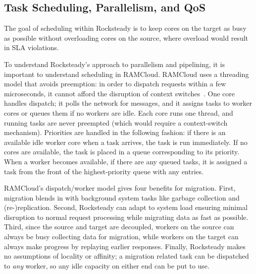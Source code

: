 \subsection{Task Scheduling, Parallelism, and QoS}
\label{sec:qos}

The goal of scheduling within Rocksteady is to keep cores on the target as
busy as possible without overloading cores on the source, where overload 
would result in SLA violations.

To understand Rocksteady's approach to parallelism and pipelining, it is
important to understand scheduling in RAMCloud.
RAMCloud uses a threading model that avoids preemption: in order to dispatch requests
within a few microseconds, it cannot afford the disruption of context
switches~\cite{ramcloud}. One core handles dispatch; it polls the network
for messages, and it assigns tasks to worker cores or queues them if no workers
are idle. Each core runs one thread, and
running tasks are never preempted (which would require a
context-switch mechanism).
Priorities are handled in the following fashion: if there is an available
idle worker core when a task arrives, the task is run immediately. If no
cores are available, the task is placed in a queue corresponding to its
priority. When a worker becomes available, if there are any queued tasks,
it is assigned a task from the front of the highest-priority queue with
any entries.

RAMCloud's dispatch/worker model gives four benefits for migration. First,
migration blends in with background system tasks like garbage collection and
(re-)replication. Second, Rocksteady can adapt to system load ensuring minimal
disruption to normal request processing while migrating data
as fast as possible. Third, since the source and
target are decoupled, workers on the source can always be busy collecting data
for migration, while workers on the target can always make progress by
replaying earlier responses.  Finally, Rocksteady makes no assumptions of
locality or affinity; a migration related task can be
dispatched to \emph{any} worker, so any idle capacity on either end can be put
to use.



